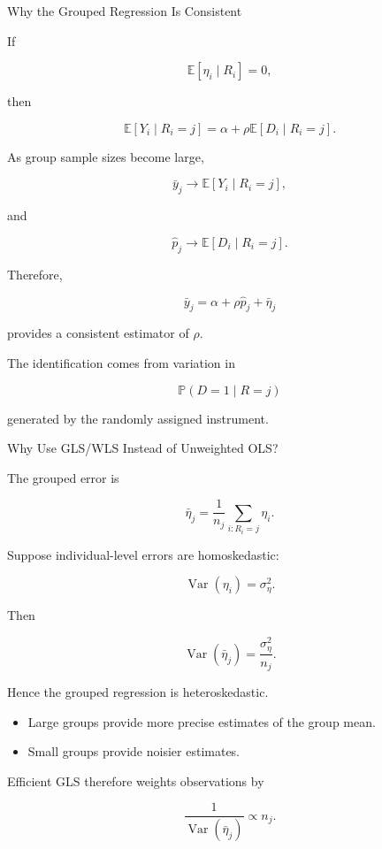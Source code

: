 \documentclass[aspectratio=169]{beamer}
\newcommand{\E}{\mathbb{E}}
\newcommand{\Var}{\operatorname{Var}}
\newcommand{\Prob}{\mathbb{P}}
\begin{document}
\begin{frame}{Why the Grouped Regression Is Consistent}

If

\[
\E[\eta_i\mid R_i]=0,
\]

then

\[
\E[Y_i\mid R_i=j]
=
\alpha+\rho\E[D_i\mid R_i=j].
\]

As group sample sizes become large,

\[
\bar y_j
\longrightarrow
\E[Y_i\mid R_i=j],
\]

and

\[
\hat p_j
\longrightarrow
\E[D_i\mid R_i=j].
\]

Therefore,

\[
\bar y_j
=
\alpha+\rho\hat p_j+\bar\eta_j
\]

provides a consistent estimator of \(\rho\).

\vspace{0.3cm}

The identification comes from variation in

\[
\boxed{
\Prob(D=1\mid R=j)
}
\]

generated by the randomly assigned instrument.

\end{frame}

\begin{frame}{Why Use GLS/WLS Instead of Unweighted OLS?}

The grouped error is

\[
\bar\eta_j
=
\frac{1}{n_j}
\sum_{i:R_i=j}\eta_i.
\]

Suppose individual-level errors are homoskedastic:

\[
\Var(\eta_i)=\sigma_\eta^2.
\]

Then

\[
\boxed{
\Var(\bar\eta_j)
=
\frac{\sigma_\eta^2}{n_j}.
}
\]

Hence the grouped regression is heteroskedastic.

\begin{itemize}
    \item Large groups provide more precise estimates of the group mean.
    \item Small groups provide noisier estimates.
\end{itemize}

Efficient GLS therefore weights observations by

\[
\frac{1}{\Var(\bar\eta_j)}
\propto n_j.
\]

\end{frame}
\end{document}
